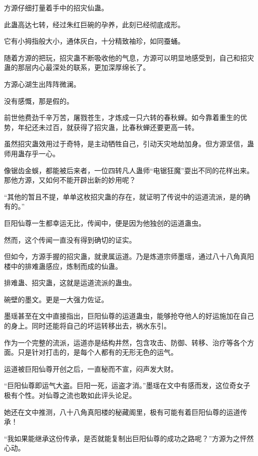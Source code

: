 
\begin{this_body}

方源仔细打量着手中的招灾仙蛊。

此蛊高达七转，经过朱红巨碗的孕养，此刻已经彻底成形。

它有小拇指般大小，通体灰白，十分精致袖珍，如同蚕蛹。

随着方源的把玩，招灾蛊不断吸收他的气息，方源可以明显地感受到，自己和招灾蛊的那层内心最深处的联系，更加深厚绵长了。

方源心湖生出阵阵微澜。

没有感慨，那是假的。

前世他费劲千辛万苦，屠戮苍生，才炼成一只六转的春秋蝉。如今靠着重生的优势，年纪还未过百，就获得了招灾蛊，比春秋蝉还要更高一转。

虽然招灾蛊效用过于奇特，是主动牺牲自己，引动天灾地劫加身。但方源坚信，蛊师用蛊存乎一心。

像锯齿金蜈，都能被后来者，一位四转凡人蛊师“电锯狂魔”耍出不同的花样出来。那他方源，又如何不能开辟出新的妙用呢？

“其他的暂且不提，单单这枚招灾蛊的存在，就证明了传说中的运道流派，是的确有的。”

巨阳仙尊一生都幸运无比，传闻中，便是因为他独创的运道蛊虫。

然而，这个传闻一直没有得到确切的证实。

但如今，方源手握的招灾蛊，就隶属运道。乃是炼道宗师墨瑶，通过八十八角真阳楼中的排难蛊感应，炼制而成的仙蛊。

排难蛊、招灾蛊，这就是运道流派的蛊虫。

碗壁的墨文。更是一大强力佐证。

墨瑶甚至在文中直接指出，巨阳仙尊的运道蛊虫，能够抢夺他人的好运施加在自己的身上。同时还能将自己的坏运转移出去，祸水东引。

作为一个完整的流派，运道亦是结构井然，包含攻击、防御、转移、治疗等各个方面。只是针对打击的，是每个人都有的无形无色的运气。

运道被巨阳仙尊开创之后，一直秘而不宣，闷声发大财。

“巨阳仙尊即运气大盗。巨阳一死，运盗才消。”墨瑶在文中有感而发，这位奇女子极有个性。对仙尊之流也敢如此评头论足。

她还在文中推测，八十八角真阳楼的秘藏阁里，极有可能有着巨阳仙尊的运道传承！

“我如果能继承这份传承，是否就能复制出巨阳仙尊的成功之路呢？”方源为之怦然心动。


\end{this_body}
